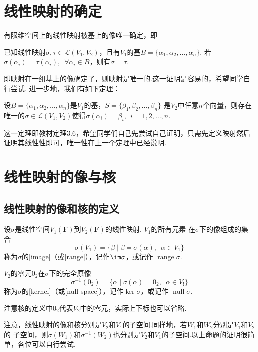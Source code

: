 \section{线性映射的确定}
有限维空间上的线性映射被基上的像唯一确定，即
\begin{theorem}
    已知线性映射$\sigma,\tau\in \mathcal{L}(V_1,V_2)$，且有$V_1$的基$B=\{\alpha_1,\alpha_2,\ldots,\alpha_n\}$.
    若$\sigma(\alpha_i)=\tau(\alpha_i),\enspace\forall \alpha_i \in B$，则有$\sigma=\tau$.
\end{theorem}
即映射在一组基上的像确定了，则映射是唯一的.这一证明是容易的，希望同学自行尝试.
进一步地，我们有如下定理：
\begin{theorem}
    设$B=\{\alpha_1,\alpha_2,\ldots,\alpha_n\}$是$V_1$的基，$S=\{\beta_1,\beta_2,\ldots,\beta_n\}$
    是$V_2$中任意$n$个向量，则存在唯一的$\sigma\in \mathcal{L}(V_1,V_2)$使得$\sigma(\alpha_i)=\beta_i,\enspace i=1,2,\ldots,n$.
\end{theorem}
这一定理即教材定理3.6，希望同学们自己先尝试自己证明，只需先定义映射然后证明其线性性即可，唯一性在上一个定理中已经说明.

\section{线性映射的像与核}
\subsection{线性映射的像和核的定义}
\begin{definition}
    设$\sigma$是线性空间$V_1(\mathbf{F})$到$V_2(\mathbf{F})$的线性映射. $V_1$的所有元素
    在$\sigma$下的像组成的集合
    \[\sigma(V_1)=\{\beta \mid \beta=\sigma(\alpha),\enspace \alpha \in V_1\}\]
    称为$\sigma$的[image]（或[range]），记作$\im \sigma$，或记作 $\operatorname{range} \sigma$.

    $V_2$的零元$0_2$在$\sigma$下的完全原像
    \[\sigma^{-1}(0_2)=\{\alpha \mid \sigma(\alpha)=0_2,\enspace \alpha \in V_!\}\]
    称为$\sigma$的[kernel]（或[null space]），记作$\ker \sigma$，或记作 $\operatorname{null} \sigma$.
\end{definition}
注意核的定义中$0_2$代表$V_2$中的零元，实际上下标也可以省略.

注意，线性映射的像和核分别是$V_2$和$V_1$的子空间.同样地，若$W_1$和$W_2$分别是$V_1$和$V_2$的
子空间，则$\sigma(W_1)$和$\sigma^{-1}(W_2)$也分别是$V_2$和$V_1$的子空间.以上命题的证明很简单，各位可以自行尝试.

